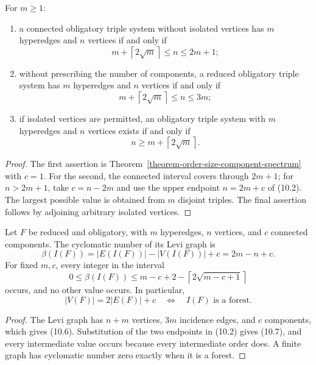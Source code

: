 \begin{corollary}
\label{corollary-connected-order-size-spectrum}
For $m\ge1$:
\begin{enumerate}
\item a connected obligatory triple system without isolated vertices has
$m$ hyperedges and $n$ vertices if and only if
\[
m+\left\lceil2\sqrt m\right\rceil\le n\le2m+1;
\]
\item without prescribing the number of components, a reduced obligatory
triple system has $m$ hyperedges and $n$ vertices if and only if
\[
m+\left\lceil2\sqrt m\right\rceil\le n\le3m;
\]
\item if isolated vertices are permitted, an obligatory triple system with
$m$ hyperedges and $n$ vertices exists if and only if
\[
n\ge m+\left\lceil2\sqrt m\right\rceil.
\]
\end{enumerate}
\end{corollary}
\begin{proof}
The first assertion is Theorem~\ref{theorem-order-size-component-spectrum}
with $c=1$.  For the second, the connected interval covers through $2m+1$;
for $n>2m+1$, take $c=n-2m$ and use the upper endpoint $n=2m+c$ of (10.2).
The largest possible value is obtained from $m$ disjoint triples.  The final
assertion follows by adjoining arbitrary isolated vertices.
\end{proof}

\begin{corollary}
\label{corollary-levi-cycle-rank-spectrum}
Let $F$ be reduced and obligatory, with $m$ hyperedges, $n$ vertices, and $c$
connected components.  The cyclomatic number of its Levi graph is
\[
\beta(I(F))=|E(I(F))|-|V(I(F))|+c=2m-n+c.
\tag{10.6}
\]
For fixed $m,c$, every integer in the interval
\[
0\le\beta(I(F))\le
m-c+2-\left\lceil2\sqrt{m-c+1}\right\rceil
\tag{10.7}
\]
occurs, and no other value occurs.  In particular,
\[
|V(F)|=2|E(F)|+c
\quad\Longleftrightarrow\quad
I(F)\text{ is a forest}.
\]
\end{corollary}
\begin{proof}
The Levi graph has $n+m$ vertices, $3m$ incidence edges, and $c$ components,
which gives (10.6).  Substitution of the two endpoints in (10.2) gives
(10.7), and every intermediate value occurs because every intermediate order
does.  A finite graph has cyclomatic number zero exactly when it is a forest.
\end{proof}

